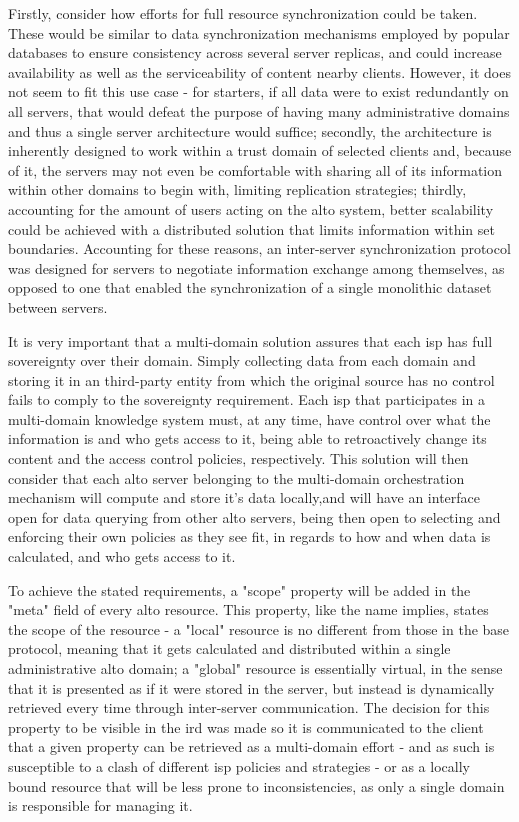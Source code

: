     Firstly, consider how efforts for full resource synchronization could be taken.
    These would be similar to data synchronization mechanisms employed by popular databases to ensure consistency across several server replicas, and could increase availability as well as the serviceability of content nearby clients.
    However, it does not seem to fit this use case - for starters, if all data were to exist redundantly on all servers, that would defeat the purpose of having many administrative domains and thus a single server architecture would suffice; secondly, the architecture is inherently designed to work within a trust domain of selected clients and, because of it, the servers may not even be comfortable with sharing all of its information within other domains to begin with, limiting replication strategies; thirdly, accounting for the amount of users acting on the \gls{alto} system, better scalability could be achieved with a distributed solution that limits information within set boundaries.
    Accounting for these reasons, an inter-server synchronization protocol was designed for servers to negotiate information exchange among themselves, as opposed to one that enabled the synchronization of a single monolithic dataset between servers.

    It is very important that a multi-domain solution assures that each \gls{isp} has full sovereignty over their domain.
    Simply collecting data from each domain and storing it in an third-party entity from which the original source has no control fails to comply to the sovereignty requirement.
    Each \gls{isp} that participates in a multi-domain knowledge system must, at any time, have control over what the information is and who gets access to it, being able to retroactively change its content and the access control policies, respectively.
    This solution will then consider that each \gls{alto} server belonging to the multi-domain orchestration mechanism will compute and store it's data locally,and will have an interface open for data querying from other \gls{alto} servers, being then open to selecting and enforcing their own policies as they see fit, in regards to how and when data is calculated, and who gets access to it.

    To achieve the stated requirements, a "scope" property will be added in the "meta" field of every \gls{alto} resource.
    This property, like the name implies, states the scope of the resource - a "local" resource is no different from those in the base protocol, meaning that it gets calculated and distributed within a single administrative \gls{alto} domain; a "global" resource is essentially virtual, in the sense that it is presented as if it were stored in the server, but instead is dynamically retrieved every time through inter-server communication.
    The decision for this property to be visible in the \gls{ird} was made so it is communicated to the client that a given property can be retrieved as a multi-domain effort - and as such is susceptible to a clash of different \gls{isp} policies and strategies - or as a locally bound resource that will be less prone to inconsistencies, as only a single domain is responsible for managing it.

